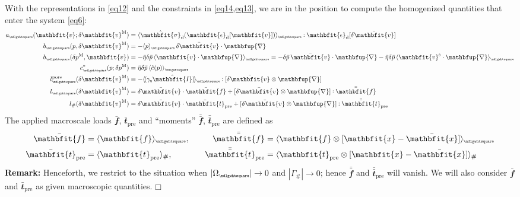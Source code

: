 \documentclass[12pt,a4paper]{article}
\renewcommand{\ta}[1]{\mathbfit{#1}}
\renewcommand{\ts}[1]{\mathbfit{#1}}
\renewcommand{\diff}{\mathbfup{\nabla}}
\renewcommand{\Box}{\mdlgwhtsquare}
\DeclarePairedDelimiter{\homgen}{\langle}{\rangle_\rve}
\DeclarePairedDelimiter{\shomgen}{\langle\!\langle}{\rangle\!\rangle_\rve}
\newcommand{\prescribed}{\mathrm{pre}}
\renewcommand{\dev}{\mathrm{d}}
\newcommand{\volume}{|\Omega_\rve|}
\newcommand{\surf}{\mathrm{s}}
\newcommand{\pore}{\mathrm{pore}}
\newcommand{\devop}{\ts\epsilon_\dev}
\newcommand{\densinv}{\bar{\eta}}
\newcommand{\rve}{
  {\mathchoice
   {\mbox{\scalebox{0.67}{$\Box$}}}
   {\mbox{\scalebox{0.67}{$\Box$}}}
   {\mbox{\scalebox{0.5}{$\Box$}}}
   {\mbox{\scalebox{0.375}{$\Box$}}}
  }
}
\begin{document}
With the representations in \cref{eq12} and the constraints in \cref{eq14,eq13}, we are in the position to compute the homogenized quantities that enter the system \cref{eq6}:
\begin{align}
    a_\rve(\ta v;\delta\ta v^\macro) &=
    \homgen{ \hat{\ts{\sigma}}_\dev(\devop[\ta v]) } \dprod \devop[\delta\bar{\ta v}] 
\label{eq15a} \\
    b_\rve(p,\delta\ta v^\macro) &=
    -  \homgen{ p }\, \delta\bar{\ta v}\cdot\diff
\label{eq15b} \\
    b_\rve(\delta p^\macro,\ta v) &=
    - \densinv\delta\bar{p}\, \homgen{ \ta v\cdot\diff } = - \delta\bar{p} \, \bar{\ta v}\cdot\diff - \densinv\delta\bar{p}\,\homgen{ \ta v^\fluct\cdot\diff }
\label{eq15c} \\
    c^*_\rve(p;\delta p^\macro) &=
    \densinv\delta\bar{p}\, \homgen{ \hat{e}(p) }
\label{eq15d} \\
    l_\rve^\pore(\delta\ta v^\macro) &=
    -\shomgen{ \gamma_\surf \hat{\ts I} } \dprod [\delta\bar{\ta v}\outerp\diff]
\label{eq15e} \\
    l_\rve(\delta\ta v^\macro) &=
    \delta\bar{\ta v}\cdot \bar{\ta f} + [\delta\bar{\ta v}\outerp\diff]\dprod \bar{\bar{\ta f}}
\label{eq15f} \\
    l_\#(\delta\ta v^\macro) &=
    \delta\bar{\ta v} \cdot \bar{\ta t}_\prescribed + [\delta\bar{\ta v}\outerp\diff]\dprod \bar{\bar{\ta{t}}}_\prescribed
\label{eq15g}
\end{align}
The applied macroscale loads $\bar{\ta f}$, $\bar{\ta t}_\prescribed$ and ``moments'' $\bar{\bar{\ta f}}$, $\bar{\bar{\ta t}}_\prescribed$ are defined as
\begin{alignat}{2}
    \bar{\ta f} &= \homgen{ \ta{f} },\quad
    &\bar{\bar{\ta f}} &= \homgen{ \ta{f}\outerp[\ta{x}-\bar{\ta{x}}] }
\label{eq15fa}
\\
    \bar{\ta t}_\prescribed &= \langle \ta{t}_\prescribed \rangle_\#,\quad
    &\bar{\bar{\ta t}}_\prescribed &= \langle \ta{t}_\prescribed\outerp[\ta{x}-\bar{\ta{x}}]  \rangle_\#
\end{alignat}
\textbf{Remark:} Henceforth, we restrict to the situation when $\volume\to 0$ and $|\Gamma_\#|\to 0$; hence $\bar{\bar{\ta f}}$ and $\bar{\bar{\ta t}}_\prescribed$ will vanish.
We will also consider $\bar{\ta f}$ and $\bar{\ta t}_\prescribed$ as given macroscopic quantities. $\Box$
\end{document}
